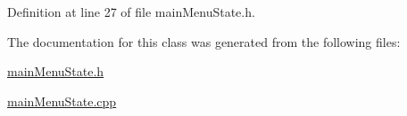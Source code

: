 Definition at line 27 of file main\+Menu\+State.\+h.



The documentation for this class was generated from the following files\+:\begin{DoxyCompactItemize}
\item 
\mbox{\hyperlink{main_menu_state_8h}{main\+Menu\+State.\+h}}\item 
\mbox{\hyperlink{main_menu_state_8cpp}{main\+Menu\+State.\+cpp}}\end{DoxyCompactItemize}
